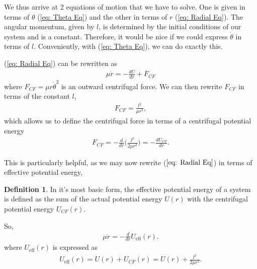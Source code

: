 \documentclass[10pt, psamsfonts]{amsart}
\theoremstyle{definition}
\newtheorem{defn}[thm]{Definition}
\theoremstyle{remark}
\numberwithin{equation}{section}
\begin{document}
We thus arrive at 2 equations of motion that we have to solve. One is given in terms of $\theta$ (\ref{eq: Theta Eq}) and the other in terms of $r$ (\ref{eq: Radial Eq}). The angular momentum, given by $l$, is determined by the initial conditions of our system and is a constant. Therefore, it would be nice if we could express $\dot{\theta}$ in terms of $l$. Conveniently, with (\ref{eq: Theta Eq}), we can do exactly this.

(\ref{eq: Radial Eq}) can be rewritten as 
\begin{align*}
  \label{eq:}
  \mu \ddot{r} = -\frac{dU}{dr} + F_{CF}
\end{align*}
where $F_{CF} = \mu r \dot{\theta}^2$ is an outward centrifugal force. We can then rewrite $F_{CF}$ in terms of the constant $l$,
\begin{gather*}
  F_{CF} = \frac{l^2}{\mu r^3},
\end{gather*}
which allows us to define the centrifugal force in terms of a centrifugal potential energy 
\begin{gather*}
  F_{CF} = -\frac{d}{dr} \bigg(\frac{l^2}{2\mu r^2}  \bigg) =  -\frac{dU_{CF}}{dr}.
\end{gather*}

This is particularly helpful, as we may now rewrite ($\ref{eq: Radial Eq}$) in terms of effective potential energy,
\begin{defn}
  In it's most basic form, the effective potential energy of a system is defined as the sum of the actual potential energy $U(r)$ with the centrifugal potential energy $U_{CF}(r)$.
\end{defn}
So, 
\begin{align}
  \label{eq:Final Result}
  \mu \ddot{r} = -\frac{d}{dr} U_{\text{eff}}(r).
\end{align}
where $U_{\text{eff}}(r)$ is expressed as
\begin{align}
  \label{eq: Effective Potential}
  U_{\text{eff}}(r) = U(r) + U_{CF}(r) = U(r) + \frac{l^2}{2\mu r^2}. 
\end{align}
\end{document}
